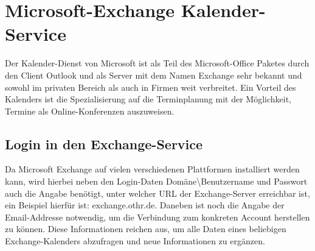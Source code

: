 \section{Microsoft-Exchange Kalender-Service}
Der Kalender-Dienst von Microsoft ist als Teil des Microsoft-Office Paketes durch den Client Outlook und als Server mit dem Namen Exchange sehr bekannt und sowohl im privaten Bereich als auch in Firmen weit verbreitet. Ein Vorteil des Kalenders ist die Spezialisierung auf die Terminplanung mit der Möglichkeit, Termine als Online-Konferenzen auszuweisen.

\subsection{Login in den Exchange-Service}
Da Microsoft Exchange auf vielen verschiedenen Plattformen installiert werden kann, wird hierbei neben den Login-Daten \glqq Domäne\textbackslash Benutzername\grqq{} und \glqq Passwort\grqq{} auch die Angabe benötigt, unter welcher URL der Exchange-Server erreichbar ist, ein Beispiel hierfür ist: \glqq exchange.othr.de\grqq{}. Daneben ist noch die Angabe der Email-Addresse notwendig, um die Verbindung zum konkreten Account herstellen zu können.
Diese Informationen reichen aus, um alle Daten eines beliebigen Exchange-Kalenders abzufragen und neue Informationen zu ergänzen. 

